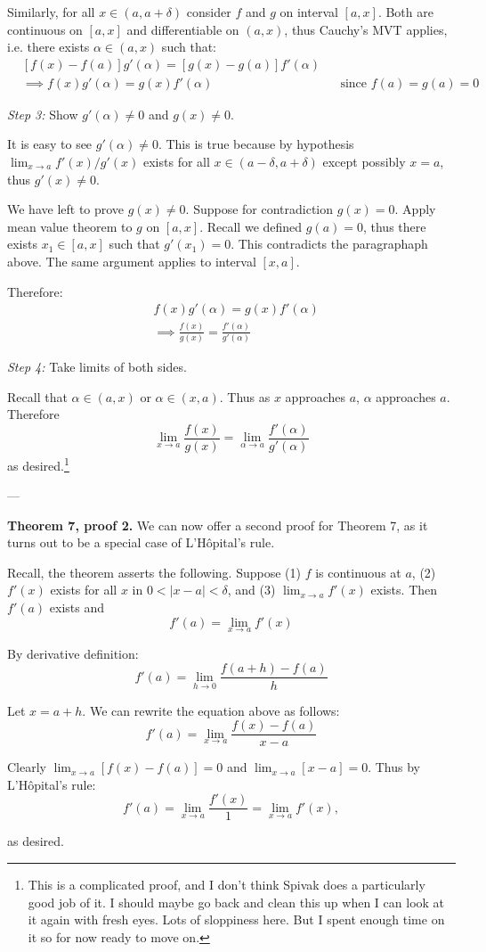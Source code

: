 Similarly, for all $x\in(a, a+\delta)$ consider $f$ and $g$ on interval $[a,x]$. Both
are continuous on $[a,x]$ and differentiable on $(a,x)$, thus Cauchy's
MVT applies, i.e. there exists $\alpha\in(a,x)$ such that:
\begin{align*}
  &[f(x)-f(a)]g'(\alpha)=[g(x)-g(a)]f'(\alpha)\\
  &\implies f(x)g'(\alpha)=g(x)f'(\alpha)&&\text{since $f(a)=g(a)=0$}
\end{align*}

\textit{Step 3:} Show $g'(\alpha)\neq0$ and $g(x)\neq0$.

\vs

It is easy to see $g'(\alpha)\neq0$. This is true because by hypothesis
$\lim_{x\to a}f'(x)/g'(x)$ exists for all $x\in(a-\delta, a+\delta)$ except possibly
$x=a$, thus $g'(x)\neq0$.

\vs

We have left to prove $g(x)\neq0$. Suppose for contradiction $g(x)=0$.
Apply mean value theorem to $g$ on $[a,x]$. Recall we defined
$g(a)=0$, thus there exists $x_1\in[a,x]$ such that $g'(x_1)=0$. This
contradicts the paragraphaph above. The same argument applies to
interval $[x,a]$.

\vs

Therefore:
\begin{align*}
  &f(x)g'(\alpha)=g(x)f'(\alpha)\\
  &\implies \frac{f(x)}{g(x)}=\frac{f'(\alpha)}{g'(\alpha)}
\end{align*}


\textit{Step 4:} Take limits of both sides.

\vs

Recall that $\alpha\in(a,x)$ or $\alpha\in(x,a)$. Thus as $x$ approaches $a$, $\alpha$
approaches $a$. Therefore
\[\lim_{x\to a}\frac{f(x)}{g(x)}=\lim_{\alpha\to a}\frac{f'(\alpha)}{g'(\alpha)}\]
as desired.\footnote{This is a complicated proof, and I don't think
  Spivak does a particularly good job of it. I should maybe go back
  and clean this up when I can look at it again with fresh eyes. Lots
  of sloppiness here. But I spent enough time on it so for now ready
  to move on.}

\vs---\vs

\textbf{Theorem 7, proof 2.} We can now offer a second proof for
Theorem 7, as it turns out to be a special case of L'H\^opital's rule.

\vs

Recall, the theorem asserts the following. Suppose (1) $f$ is
continuous at $a$, (2) $f'(x)$ exists for all $x$ in $0<|x-a|<\delta$, and
(3) $\lim_{x\to a}f'(x)$ exists. Then $f'(a)$ exists and
\[f'(a)=\lim_{x\to a}f'(x)\]

\vs

By derivative definition:
\[f'(a)=\lim_{h\to0}\frac{f(a+h)-f(a)}{h}\]

Let $x=a+h$. We can rewrite the equation above as follows:
\[f'(a)=\lim_{x\to a}\frac{f(x)-f(a)}{x-a}\]

Clearly $\lim_{x\to a}[f(x)-f(a)]=0$ and $\lim_{x\to a}[x-a]=0$. Thus by
L'H\^opital's rule:
\[f'(a)=\lim_{x\to a}\frac{f'(x)}{1}=\lim_{x\to a}f'(x),\]

as desired.


